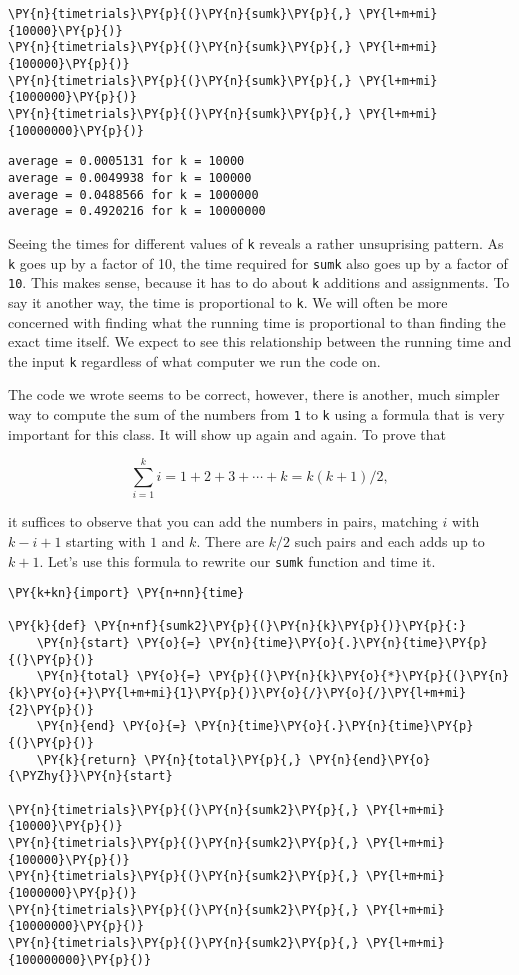 \begin{Verbatim}[commandchars=\\\{\}]
\PY{n}{timetrials}\PY{p}{(}\PY{n}{sumk}\PY{p}{,} \PY{l+m+mi}{10000}\PY{p}{)}
\PY{n}{timetrials}\PY{p}{(}\PY{n}{sumk}\PY{p}{,} \PY{l+m+mi}{100000}\PY{p}{)}
\PY{n}{timetrials}\PY{p}{(}\PY{n}{sumk}\PY{p}{,} \PY{l+m+mi}{1000000}\PY{p}{)}
\PY{n}{timetrials}\PY{p}{(}\PY{n}{sumk}\PY{p}{,} \PY{l+m+mi}{10000000}\PY{p}{)}
\end{Verbatim}

\begin{Verbatim}
average = 0.0005131 for k = 10000
average = 0.0049938 for k = 100000
average = 0.0488566 for k = 1000000
average = 0.4920216 for k = 10000000
\end{Verbatim}


Seeing the times for different values of \texttt{k} reveals a rather unsuprising pattern.
As \texttt{k} goes up by a factor of 10, the time required for \texttt{sumk} also goes up by a factor of \texttt{10}.
This makes sense, because it has to do about \texttt{k} additions and assignments.
To say it another way, the time is proportional to \texttt{k}.
We will often be more concerned with finding what the running time is proportional to than finding the exact time itself.
We expect to see this relationship between the running time and the input \texttt{k} regardless of what computer we run the code on.


The code we wrote seems to be correct, however, there is another, much simpler way to compute the sum of the numbers from \texttt{1} to \texttt{k} using a formula that is very important for this class.
It will show up again and again.
To prove that


\[
\sum_{i = 1}^k i = 1 + 2 + 3 + \cdots + k = k (k + 1) / 2,
\]


it suffices to observe that you can add the numbers in pairs, matching $i$ with $k-i + 1$ starting with $1$ and $k$.
There are $k/2$ such pairs and each adds up to $k+1$.
Let's use this formula to rewrite our \texttt{sumk} function and time it.


\begin{Verbatim}[commandchars=\\\{\}]
\PY{k+kn}{import} \PY{n+nn}{time}

\PY{k}{def} \PY{n+nf}{sumk2}\PY{p}{(}\PY{n}{k}\PY{p}{)}\PY{p}{:}
    \PY{n}{start} \PY{o}{=} \PY{n}{time}\PY{o}{.}\PY{n}{time}\PY{p}{(}\PY{p}{)}
    \PY{n}{total} \PY{o}{=} \PY{p}{(}\PY{n}{k}\PY{o}{*}\PY{p}{(}\PY{n}{k}\PY{o}{+}\PY{l+m+mi}{1}\PY{p}{)}\PY{o}{/}\PY{o}{/}\PY{l+m+mi}{2}\PY{p}{)}
    \PY{n}{end} \PY{o}{=} \PY{n}{time}\PY{o}{.}\PY{n}{time}\PY{p}{(}\PY{p}{)}
    \PY{k}{return} \PY{n}{total}\PY{p}{,} \PY{n}{end}\PY{o}{\PYZhy{}}\PY{n}{start}

\PY{n}{timetrials}\PY{p}{(}\PY{n}{sumk2}\PY{p}{,} \PY{l+m+mi}{10000}\PY{p}{)}
\PY{n}{timetrials}\PY{p}{(}\PY{n}{sumk2}\PY{p}{,} \PY{l+m+mi}{100000}\PY{p}{)}
\PY{n}{timetrials}\PY{p}{(}\PY{n}{sumk2}\PY{p}{,} \PY{l+m+mi}{1000000}\PY{p}{)}
\PY{n}{timetrials}\PY{p}{(}\PY{n}{sumk2}\PY{p}{,} \PY{l+m+mi}{10000000}\PY{p}{)}
\PY{n}{timetrials}\PY{p}{(}\PY{n}{sumk2}\PY{p}{,} \PY{l+m+mi}{100000000}\PY{p}{)}
\end{Verbatim}

